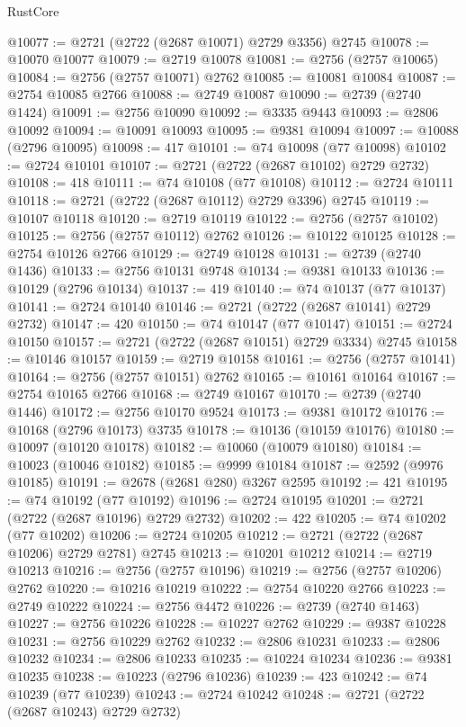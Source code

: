 \begin{lexlean}{RustCore}
\begin{coremodule}
@10077 := @2721 (@2722 (@2687 @10071) @2729 @3356) @2745
@10078 := @10070 @10077
@10079 := @2719 @10078
@10081 := @2756 (@2757 @10065)
@10084 := @2756 (@2757 @10071) @2762
@10085 := @10081 @10084
@10087 := @2754 @10085 @2766
@10088 := @2749 @10087
@10090 := @2739 (@2740 @1424)
@10091 := @2756 @10090
@10092 := @3335 @9443
@10093 := @2806 @10092
@10094 := @10091 @10093
@10095 := @9381 @10094
@10097 := @10088 (@2796 @10095)
@10098 := 417
@10101 := @74 @10098 (@77 @10098)
@10102 := @2724 @10101
@10107 := @2721 (@2722 (@2687 @10102) @2729 @2732)
@10108 := 418
@10111 := @74 @10108 (@77 @10108)
@10112 := @2724 @10111
@10118 := @2721 (@2722 (@2687 @10112) @2729 @3396) @2745
@10119 := @10107 @10118
@10120 := @2719 @10119
@10122 := @2756 (@2757 @10102)
@10125 := @2756 (@2757 @10112) @2762
@10126 := @10122 @10125
@10128 := @2754 @10126 @2766
@10129 := @2749 @10128
@10131 := @2739 (@2740 @1436)
@10133 := @2756 @10131 @9748
@10134 := @9381 @10133
@10136 := @10129 (@2796 @10134)
@10137 := 419
@10140 := @74 @10137 (@77 @10137)
@10141 := @2724 @10140
@10146 := @2721 (@2722 (@2687 @10141) @2729 @2732)
@10147 := 420
@10150 := @74 @10147 (@77 @10147)
@10151 := @2724 @10150
@10157 := @2721 (@2722 (@2687 @10151) @2729 @3334) @2745
@10158 := @10146 @10157
@10159 := @2719 @10158
@10161 := @2756 (@2757 @10141)
@10164 := @2756 (@2757 @10151) @2762
@10165 := @10161 @10164
@10167 := @2754 @10165 @2766
@10168 := @2749 @10167
@10170 := @2739 (@2740 @1446)
@10172 := @2756 @10170 @9524
@10173 := @9381 @10172
@10176 := @10168 (@2796 @10173) @3735
@10178 := @10136 (@10159 @10176)
@10180 := @10097 (@10120 @10178)
@10182 := @10060 (@10079 @10180)
@10184 := @10023 (@10046 @10182)
@10185 := @9999 @10184
@10187 := @2592 (@9976 @10185)
@10191 := @2678 (@2681 @280) @3267 @2595
@10192 := 421
@10195 := @74 @10192 (@77 @10192)
@10196 := @2724 @10195
@10201 := @2721 (@2722 (@2687 @10196) @2729 @2732)
@10202 := 422
@10205 := @74 @10202 (@77 @10202)
@10206 := @2724 @10205
@10212 := @2721 (@2722 (@2687 @10206) @2729 @2781) @2745
@10213 := @10201 @10212
@10214 := @2719 @10213
@10216 := @2756 (@2757 @10196)
@10219 := @2756 (@2757 @10206) @2762
@10220 := @10216 @10219
@10222 := @2754 @10220 @2766
@10223 := @2749 @10222
@10224 := @2756 @4472
@10226 := @2739 (@2740 @1463)
@10227 := @2756 @10226
@10228 := @10227 @2762
@10229 := @9387 @10228
@10231 := @2756 @10229 @2762
@10232 := @2806 @10231
@10233 := @2806 @10232
@10234 := @2806 @10233
@10235 := @10224 @10234
@10236 := @9381 @10235
@10238 := @10223 (@2796 @10236)
@10239 := 423
@10242 := @74 @10239 (@77 @10239)
@10243 := @2724 @10242
@10248 := @2721 (@2722 (@2687 @10243) @2729 @2732)

\end{coremodule}
\end{lexlean}
